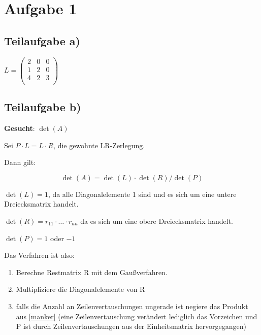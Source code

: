 \section*{Aufgabe 1}
\subsection*{Teilaufgabe a)}

$
L =
\begin{pmatrix}
2 & 0 & 0 \\
1 & 2 & 0 \\
4 & 2 & 3 \\
\end{pmatrix}
$


\subsection*{Teilaufgabe b)}
\textbf{Gesucht}: $\det(A)$

Sei $P \cdot L = L \cdot R$, die gewohnte LR-Zerlegung.

Dann gilt:

\[\det(A) = \det(L) \cdot \det(R) / \det(P)\]

$\det(L) = 1$, da alle Diagonalelemente 1 sind und es sich um eine untere Dreiecksmatrix handelt.

$\det(R) = r_{11} \cdot \ldots \cdot r_{nn} $ da es sich um eine obere Dreiecksmatrix handelt.


$\det(P) = 1$ oder $-1$

Das Verfahren ist also:
\begin{enumerate}
\item Berechne Restmatrix R mit dem Gaußverfahren.
\item \label{manker} Multipliziere die Diagonalelemente von R
\item falls die Anzahl an Zeilenvertauschungen ungerade ist negiere das Produkt aus \ref{manker} (eine Zeilenvertauschung verändert lediglich das Vorzeichen und P ist durch Zeilenvertauschungen aus der Einheitsmatrix hervorgegangen)
\end{enumerate}
